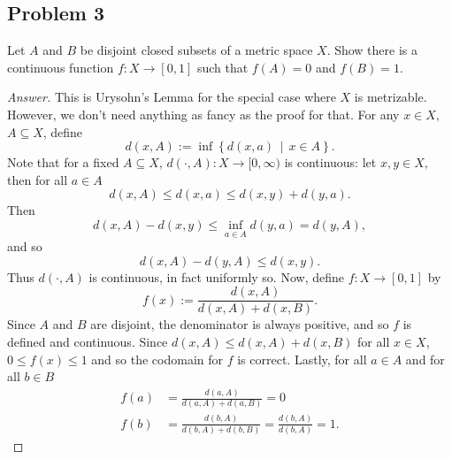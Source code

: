 \documentclass[12pt]{article}
\newcommand\setb[1]{\left \{ #1 \right \}}
\theoremstyle{definition}
\begin{document}
\subsection{Problem 3 \texorpdfstring{\cite{Munkres}}{}}
Let $A$ and $B$ be disjoint closed subsets of a metric space $X$. Show there is a continuous function $f : X \to [0,1]$ such that $f(A) = 0$ and $f(B) = 1$.
\begin{proof}[Answer]
    This is Urysohn's Lemma for the special case where $X$ is metrizable. However, we don't need anything as fancy as the proof for that. For any $x \in X$, $A \subseteq X$, define
    \[
        d(x,A) := \inf\setb{ d(x,a) \, \middle| \, x \in A }.
    \]
    Note that for a fixed $A \subseteq X$, $d(\cdot,A) : X \to [0,\infty)$ is continuous: let $x , y \in X$, then for all $a \in A$
    \[
        d(x,A) \leq d(x,a) \leq d(x,y) + d(y,a).
    \]
    Then 
    \[
        d(x,A) - d(x,y) \leq \inf\limits_{a \in A} d(y,a) = d(y,A),
    \]
    and so 
    \[
        d(x,A) - d(y,A) \leq d(x,y).
    \]
    Thus $d(\cdot,A)$ is continuous, in fact uniformly so. Now, define $f : X \to [0,1]$ by 
    \[
        f(x) := \frac{d(x,A)}{d(x,A) + d(x,B)}.
    \]
    Since $A$ and $B$ are disjoint, the denominator is always positive, and so $f$ is defined and continuous. Since $d(x,A) \leq d(x,A) + d(x,B)$ for all $x \in X$, $0 \leq f(x) \leq 1$ and so the codomain for $f$ is correct. Lastly, for all $a \in A$ and for all $b \in B$
    \begin{align*}
        f(a) & = \frac{d(a,A)}{d(a,A) + d(a,B)} = 0 \\
        f(b) & = \frac{d(b,A)}{d(b,A) + d(b,B)} = \frac{d(b,A)}{d(b,A)} = 1.
    \end{align*}
\end{proof}
\end{document}
